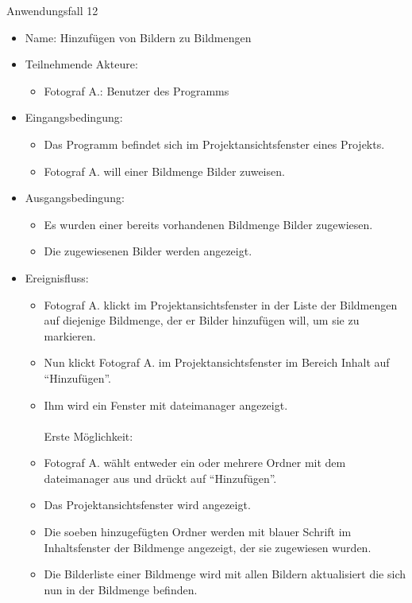 	\begin{description}
		\item[Anwendungsfall 12]
	\end{description}
	
	\begin{itemize}
		\item Name: Hinzufügen von Bildern zu Bildmengen
		\item Teilnehmende Akteure:
		\begin{itemize}
			\item	Fotograf A.: Benutzer des Programms		
		\end{itemize}
		\item Eingangsbedingung:
		\begin{itemize}
			\item	Das Programm befindet sich im Projektansichtsfenster eines Projekts.
			\item Fotograf A. will einer Bildmenge Bilder zuweisen.
		\end{itemize}
		\item Ausgangsbedingung:
		\begin{itemize}
			\item	Es wurden einer bereits vorhandenen Bildmenge Bilder zugewiesen.
			\item Die zugewiesenen Bilder werden angezeigt.
		\end{itemize}
		\item Ereignisfluss:
		\begin{itemize}
			\item Fotograf A. klickt im Projektansichtsfenster in der Liste der Bildmengen auf diejenige Bildmenge, der er Bilder hinzufügen will, um sie zu markieren.		
			\item Nun klickt Fotograf A. im Projektansichtsfenster im Bereich Inhalt auf "`Hinzufügen"'.
			\item Ihm wird ein Fenster mit \gls{dateimanager} angezeigt.\\\\Erste Möglichkeit:\\
			\item Fotograf A. wählt entweder ein oder mehrere Ordner mit dem  \gls{dateimanager} aus und drückt auf "`Hinzufügen"'.
			\item Das Projektansichtsfenster wird angezeigt.
			\item Die soeben hinzugefügten Ordner werden mit blauer Schrift im Inhaltsfenster der Bildmenge angezeigt, der sie zugewiesen wurden.
			\item Die Bilderliste einer Bildmenge wird mit allen Bildern aktualisiert die sich nun in der Bildmenge befinden.

\end{itemize}
\end{itemize}
